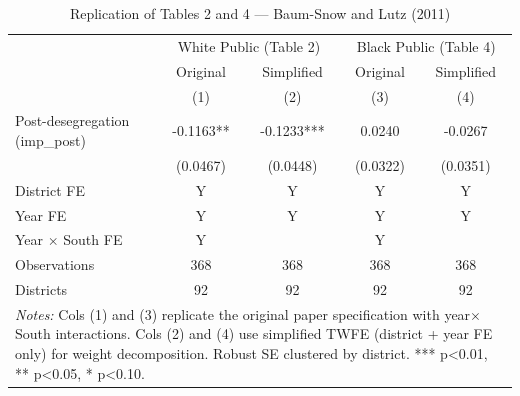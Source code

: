 \begin{table}[htbp]
\centering
\caption{Replication of Tables 2 and 4 --- Baum-Snow and Lutz (2011)}
\label{tab:baumsnow_replication}
\begin{tabular}{lcccc}
\toprule
 & \multicolumn{2}{c}{White Public (Table 2)} & \multicolumn{2}{c}{Black Public (Table 4)} \\
 & Original & Simplified & Original & Simplified \\
 & (1) & (2) & (3) & (4) \\
\midrule
Post-desegregation (imp\_post)
 & -0.1163** & -0.1233*** & 0.0240 & -0.0267 \\
 & (0.0467) & (0.0448) & (0.0322) & (0.0351) \\
\addlinespace
District FE & Y & Y & Y & Y \\
Year FE & Y & Y & Y & Y \\
Year $\times$ South FE & Y & & Y & \\
Observations & 368 & 368 & 368 & 368 \\
Districts & 92 & 92 & 92 & 92 \\
\bottomrule
\multicolumn{5}{p{0.95\linewidth}}{\footnotesize
 \textit{Notes:} Cols (1) and (3) replicate the original paper specification
 with year$\times$South interactions. Cols (2) and (4) use simplified
 TWFE (district + year FE only) for weight decomposition.
 Robust SE clustered by district. *** p<0.01, ** p<0.05, * p<0.10.}
\end{tabular}
\end{table}
